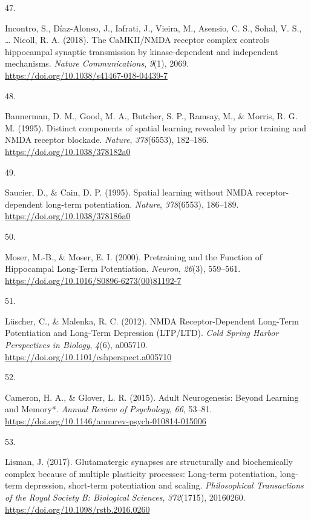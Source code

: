 \documentclass[
  11pt,
  letterpaper,
]{scrreprt}
\newlength{\cslhangindent}
\newlength{\csllabelwidth}
\newenvironment{CSLReferences}[2] %
 {\begin{list}{}{%
  \setlength{\itemindent}{0pt}
  \setlength{\leftmargin}{0pt}
  \setlength{\parsep}{0pt}
  \ifodd #1
   \setlength{\leftmargin}{\cslhangindent}
   \setlength{\itemindent}{-1\cslhangindent}
  \fi
  \setlength{\itemsep}{#2\baselineskip}}}
 {\end{list}}
\newcommand{\CSLLeftMargin}[1]{\parbox[t]{\csllabelwidth}{\strut#1\strut}}
\newcommand{\CSLRightInline}[1]{\parbox[t]{\linewidth - \csllabelwidth}{\strut#1\strut}}
\begin{document}
\begin{CSLReferences}{0}{0}
\CSLLeftMargin{47. }%
\CSLRightInline{Incontro, S., Díaz-Alonso, J., Iafrati, J., Vieira, M.,
Asensio, C. S., Sohal, V. S., \ldots{} Nicoll, R. A. (2018). The
{CaMKII}/{NMDA} receptor complex controls hippocampal synaptic
transmission by kinase-dependent and independent mechanisms.
\emph{Nature Communications}, \emph{9}(1), 2069.
\url{https://doi.org/10.1038/s41467-018-04439-7}}

\CSLLeftMargin{48. }%
\CSLRightInline{Bannerman, D. M., Good, M. A., Butcher, S. P., Ramsay,
M., \& Morris, R. G. M. (1995). Distinct components of spatial learning
revealed by prior training and {NMDA} receptor blockade. \emph{Nature},
\emph{378}(6553), 182--186. \url{https://doi.org/10.1038/378182a0}}

\CSLLeftMargin{49. }%
\CSLRightInline{Saucier, D., \& Cain, D. P. (1995). Spatial learning
without {NMDA} receptor-dependent long-term potentiation. \emph{Nature},
\emph{378}(6553), 186--189. \url{https://doi.org/10.1038/378186a0}}

\CSLLeftMargin{50. }%
\CSLRightInline{Moser, M.-B., \& Moser, E. I. (2000). Pretraining and
the {Function} of {Hippocampal Long-Term Potentiation}. \emph{Neuron},
\emph{26}(3), 559--561.
\url{https://doi.org/10.1016/S0896-6273(00)81192-7}}

\CSLLeftMargin{51. }%
\CSLRightInline{Lüscher, C., \& Malenka, R. C. (2012). {NMDA
Receptor-Dependent Long-Term Potentiation} and {Long-Term Depression}
({LTP}/{LTD}). \emph{Cold Spring Harbor Perspectives in Biology},
\emph{4}(6), a005710. \url{https://doi.org/10.1101/cshperspect.a005710}}

\CSLLeftMargin{52. }%
\CSLRightInline{Cameron, H. A., \& Glover, L. R. (2015). Adult
{Neurogenesis}: {Beyond Learning} and {Memory}*. \emph{Annual Review of
Psychology}, \emph{66}, 53--81.
\url{https://doi.org/10.1146/annurev-psych-010814-015006}}

\CSLLeftMargin{53. }%
\CSLRightInline{Lisman, J. (2017). Glutamatergic synapses are
structurally and biochemically complex because of multiple plasticity
processes: Long-term potentiation, long-term depression, short-term
potentiation and scaling. \emph{Philosophical Transactions of the Royal
Society B: Biological Sciences}, \emph{372}(1715), 20160260.
\url{https://doi.org/10.1098/rstb.2016.0260}}


\end{CSLReferences}
\end{document}
